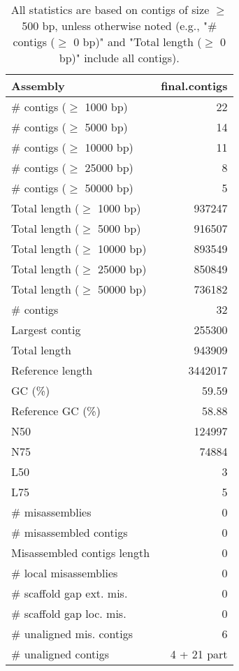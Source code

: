 \documentclass[12pt,a4paper]{article}
\begin{document}
\begin{table}[ht]
\begin{center}
\caption{All statistics are based on contigs of size $\geq$ 500 bp, unless otherwise noted (e.g., "\# contigs ($\geq$ 0 bp)" and "Total length ($\geq$ 0 bp)" include all contigs).}
\begin{tabular}{|l*{1}{|r}|}
\hline
Assembly & final.contigs \\ \hline
\# contigs ($\geq$ 1000 bp) & 22 \\ \hline
\# contigs ($\geq$ 5000 bp) & 14 \\ \hline
\# contigs ($\geq$ 10000 bp) & 11 \\ \hline
\# contigs ($\geq$ 25000 bp) & 8 \\ \hline
\# contigs ($\geq$ 50000 bp) & 5 \\ \hline
Total length ($\geq$ 1000 bp) & 937247 \\ \hline
Total length ($\geq$ 5000 bp) & 916507 \\ \hline
Total length ($\geq$ 10000 bp) & 893549 \\ \hline
Total length ($\geq$ 25000 bp) & 850849 \\ \hline
Total length ($\geq$ 50000 bp) & 736182 \\ \hline
\# contigs & 32 \\ \hline
Largest contig & 255300 \\ \hline
Total length & 943909 \\ \hline
Reference length & 3442017 \\ \hline
GC (\%) & 59.59 \\ \hline
Reference GC (\%) & 58.88 \\ \hline
N50 & 124997 \\ \hline
N75 & 74884 \\ \hline
L50 & 3 \\ \hline
L75 & 5 \\ \hline
\# misassemblies & 0 \\ \hline
\# misassembled contigs & 0 \\ \hline
Misassembled contigs length & 0 \\ \hline
\# local misassemblies & 0 \\ \hline
\# scaffold gap ext. mis. & 0 \\ \hline
\# scaffold gap loc. mis. & 0 \\ \hline
\# unaligned mis. contigs & 6 \\ \hline
\# unaligned contigs & 4 + 21 part \\ \hline

\end{tabular}
\end{center}
\end{table}
\end{document}
